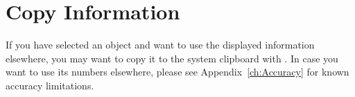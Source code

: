 \section{Copy Information}
\label{sec:tour:copyInfo}

If you have selected an object and want to use the displayed
information elsewhere, you may want to copy it to the system clipboard
with . In case you want to use its numbers
elsewhere, please see Appendix~\ref{ch:Accuracy} for known accuracy
limitations.



